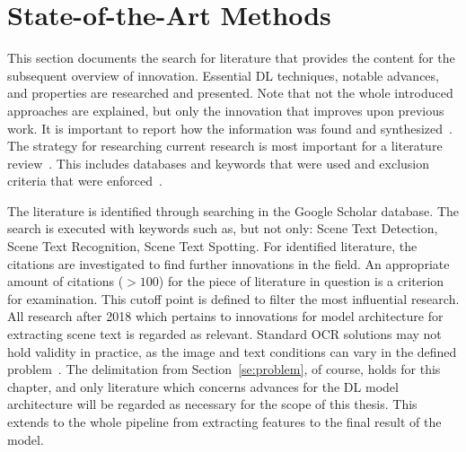 \section{State-of-the-Art Methods}\label{se:innovations}
This section documents the search for literature that provides the content for the subsequent
overview of innovation.
Essential \ac{DL} techniques, notable advances, and properties are researched
and presented.
Note that not the whole introduced approaches are explained, but only the innovation that
improves upon previous work.
It is important to report how the information was found and
synthesized~\citep{torraco_writing_2005}.
The strategy for researching current research is most important for a literature
review~\citep{snyder_literature_2019}.
This includes databases and keywords that were used and exclusion criteria that were
enforced~\citep{torraco_writing_2005}.

The literature is identified through searching in the Google Scholar database.
The search is executed with keywords such as, but not only: Scene Text Detection,
Scene Text Recognition, Scene Text Spotting.
For identified literature, the citations are investigated to find further innovations in the field.
An appropriate amount of citations ($>100$) for the piece of literature in question is a
criterion for examination.
This cutoff point is defined to filter the most influential research.
All research after 2018 which pertains to innovations for model architecture for extracting scene
text is regarded as relevant.
Standard \ac{OCR} solutions may not hold validity in practice, as the image and text conditions can
vary in the defined problem~\citep{chen_text_2021}.
The delimitation from Section~\ref{se:problem}, of course, holds for this chapter, and only literature
which concerns advances for the \ac{DL} model architecture will be regarded as necessary for the
scope of this thesis.
This extends to the whole pipeline from extracting features to the final result of the model.

